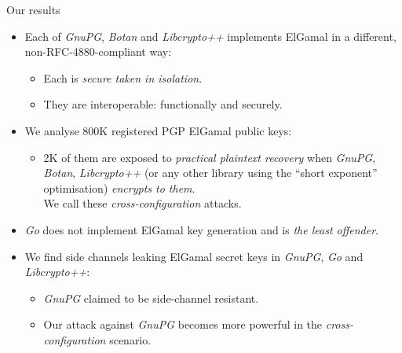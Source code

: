 \documentclass[aspectratio=169]{beamer}
\begin{document}
\begin{frame}{Our results}
  \begin{itemize}
    \setlength{\itemsep}{1em}
  \item<1-> Each of \emph{GnuPG}, \emph{Botan} and \emph{Libcrypto++}
    implements ElGamal in a different, non-RFC-4880-compliant way:
    \begin{itemize}
    \item Each is \emph{secure taken in isolation}.
    \item They are interoperable: functionally and securely.
    \end{itemize}
  \item<3-> We analyse 800K registered PGP ElGamal public keys:
    \begin{itemize}
    \item 2K of them are exposed to \emph{practical plaintext
        recovery} when \emph{GnuPG}, \emph{Botan}, \emph{Libcrypto++}
      (or any other library using the ``short exponent'' optimisation)
      \emph{encrypts to them}.\\
      We call these \emph{cross-configuration} attacks.
    \end{itemize}
  \item<2-> \emph{Go} does not implement ElGamal key generation and is \emph{the
    least offender}.
  \item<4-> We find side channels leaking ElGamal secret keys in \emph{GnuPG}, \emph{Go} and
    \emph{Libcrypto++}:
    \begin{itemize}
    \item \emph{GnuPG} claimed to be side-channel resistant.
    \item Our attack against \emph{GnuPG} becomes more powerful in the
      \emph{cross-configuration} scenario.
    \end{itemize}
  \end{itemize}
\end{frame}

\end{document}
